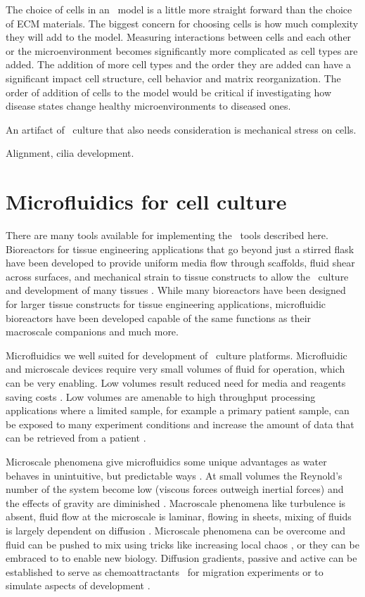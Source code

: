 The choice of cells in an \invitro\ model is a little more straight forward than the choice of ECM materials. The biggest concern for choosing cells is how much complexity they will add to the model. Measuring interactions between cells and each other or the microenvironment becomes significantly more complicated as cell types are added. The addition of more cell types and the order they are added can have a significant impact cell structure, cell behavior and matrix reorganization. The order of addition of cells to the model would be critical if investigating how disease states change healthy microenvironments to diseased ones. 

An artifact of \invitro\ culture that also needs consideration is mechanical stress on cells. 

Alignment, cilia development. 

\section{Microfluidics for cell culture}

There are many tools available for implementing the \invitro\ tools described here. Bioreactors for tissue engineering applications that go beyond just a stirred flask have been developed to provide uniform media flow through scaffolds, fluid shear across surfaces, and mechanical strain to tissue constructs to allow the \invitro\ culture and development of many tissues \cite{Martin2004}. While many bioreactors have been designed for larger tissue constructs for tissue engineering applications, microfluidic bioreactors have been developed capable of the same functions as their macroscale companions and much more\cite{}. 

Microfluidics we well suited for development of \invitro\ culture platforms. Microfluidic and microscale devices require very small volumes of fluid for operation, which can be very enabling. Low volumes result reduced need for media and reagents saving costs \cite{}. Low volumes are amenable to high throughput processing applications where a limited sample, for example a primary patient sample, can be exposed to many experiment conditions and increase the amount of data that can be retrieved from a patient \cite{}. 

Microscale phenomena give microfluidics some unique advantages as water behaves in unintuitive, but predictable ways \cite{}. At small volumes the Reynold's number of the system become low (viscous forces outweigh inertial forces) and the effects of gravity are diminished \cite{}. Macroscale phenomena like turbulence is absent, fluid flow at the microscale is laminar, flowing in sheets, mixing of fluids is largely dependent on diffusion \cite{}. Microscale phenomena can be overcome and fluid can be pushed to mix using tricks like increasing local chaos \cite{}, or they can be embraced to to enable new \invitro biology. Diffusion gradients, passive and active can be established to serve as chemoattractants \cite{}\ for migration experiments or to simulate aspects of development \cite{}.

